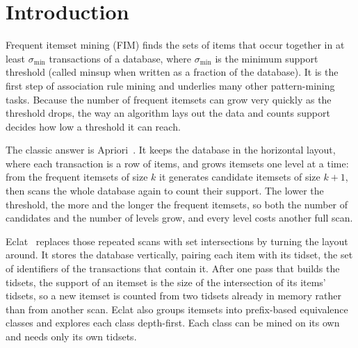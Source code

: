 \section{Introduction}
Frequent itemset mining (FIM) finds the sets of items that occur together in at least
$\sigma_{\min}$ transactions of a database, where $\sigma_{\min}$ is the minimum support
threshold (called minsup when written as a fraction of the database). It is the first
step of association rule mining and underlies many other pattern-mining tasks. Because
the number of frequent itemsets can grow very quickly as the threshold drops, the way an
algorithm lays out the data and counts support decides how low a threshold it can reach.

The classic answer is Apriori~\cite{agrawal1994}. It keeps the database in the
horizontal layout, where each transaction is a row of items, and grows itemsets one level
at a time: from the frequent itemsets of size $k$ it generates candidate itemsets of size
$k+1$, then scans the whole database again to count their support. The lower the
threshold, the more and the longer the frequent itemsets, so both the number of
candidates and the number of levels grow, and every level costs another full scan.

Eclat~\cite{zaki2000} replaces those repeated scans with set intersections by turning the
layout around. It stores the database vertically, pairing each item with its tidset, the
set of identifiers of the transactions that contain it. After one pass that builds the
tidsets, the support of an itemset is the size of the intersection of its items'
tidsets, so a new itemset is counted from two tidsets already in memory rather than from
another scan. Eclat also groups itemsets into prefix-based equivalence classes and
explores each class depth-first. Each class can be mined on its own and needs only its
own tidsets.

